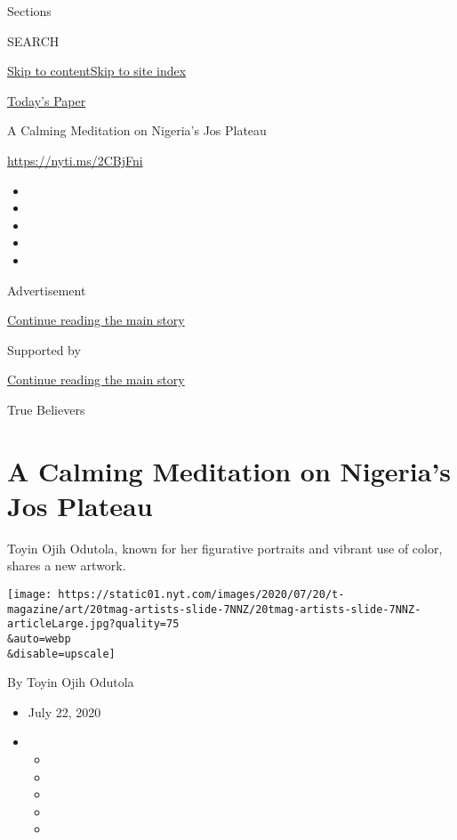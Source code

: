 Sections

SEARCH

\protect\hyperlink{site-content}{Skip to
content}\protect\hyperlink{site-index}{Skip to site index}

\href{https://myaccount.nytimes.com/auth/login?response_type=cookie\&client_id=vi}{}

\href{https://www.nytimes.com/section/todayspaper}{Today's Paper}

A Calming Meditation on Nigeria's Jos Plateau

\url{https://nyti.ms/2CBjFni}

\begin{itemize}
\item
\item
\item
\item
\item
\end{itemize}

Advertisement

\protect\hyperlink{after-top}{Continue reading the main story}

Supported by

\protect\hyperlink{after-sponsor}{Continue reading the main story}

True Believers

\hypertarget{a-calming-meditation-on-nigerias-jos-plateau}{%
\section{A Calming Meditation on Nigeria's Jos
Plateau}\label{a-calming-meditation-on-nigerias-jos-plateau}}

Toyin Ojih Odutola, known for her figurative portraits and vibrant use
of color, shares a new artwork.

\texttt{[image: https://static01.nyt.com/images/2020/07/20/t-magazine/art/20tmag-artists-slide-7NNZ/20tmag-artists-slide-7NNZ-articleLarge.jpg?quality=75\\\&auto=webp\\\&disable=upscale]}

By Toyin Ojih Odutola

\begin{itemize}
\item
  July 22, 2020
\item
  \begin{itemize}
  \item
  \item
  \item
  \item
  \item
  \end{itemize}
\end{itemize}

